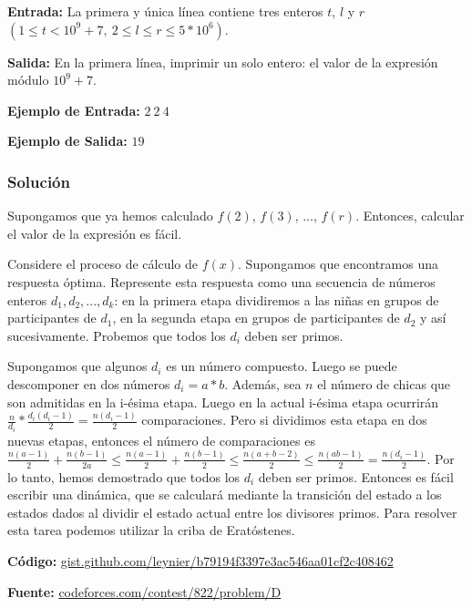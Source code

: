 \documentclass[12pt]{article}
\newcommand{\nl}{\vspace{0.3cm}}
\begin{document}
\textbf{Entrada:} La primera y única línea contiene tres enteros $t$, $l$ y $r$ $(1 \leqslant t < 10^9 + 7,\ 2 \leqslant l \leqslant r \leqslant 5 * 10^6)$.

\nl

\textbf{Salida:} En la primera línea, imprimir un solo entero: el valor de la expresión módulo $10^9 + 7$.

\nl

\textbf{Ejemplo de Entrada:} $2\ 2\ 4$

\nl

\textbf{Ejemplo de Salida:} $19$

\subsubsection{Solución}

Supongamos que ya hemos calculado $f(2)$, $f(3)$, $...$, $f(r)$. Entonces, calcular el valor de la expresión es fácil.

\nl

Considere el proceso de cálculo de $f(x)$. Supongamos que encontramos una respuesta óptima. Represente esta respuesta como una secuencia de números enteros $d_1, d_2, ..., d_k$: en la primera etapa dividiremos a las niñas en grupos de participantes de $d_1$, en la segunda etapa en grupos de participantes de $d_2$ y así sucesivamente. Probemos que todos los $d_i$ deben ser primos.

\nl

Supongamos que algunos $d_i$ es un número compuesto. Luego se puede descomponer en dos números $d_i = a * b$. Además, sea $n$ el número de chicas que son admitidas en la i-ésima etapa. Luego en la actual i-ésima etapa ocurrirán $ \frac{n}{d_i} * \frac{d_i(d_i - 1)}{2} =  \frac{n(d_i - 1)}{2}$ comparaciones. Pero si dividimos esta etapa en dos nuevas etapas, entonces el número de comparaciones es $ \frac{n(a-1)}{2} + \frac{n(b - 1)}{2a} \leqslant \frac{n(a-1)}{2} + \frac{n(b-1)}{2} \leqslant \frac{n(a+b-2)}{2} \leqslant \frac{n(ab - 1)}{2} = \frac{n(d_i - 1)}{2}$. Por lo tanto, hemos demostrado que todos los $d_i$ deben ser primos. Entonces es fácil escribir una dinámica, que se calculará mediante la transición del estado a los estados dados al dividir el estado actual entre los divisores primos. Para resolver esta tarea podemos utilizar la criba de Eratóstenes.

\nl

\textbf{Código:} \href{https://gist.github.com/leynier/b79194f3397e3ac546aa01cf2c408462}{gist.github.com/leynier/b79194f3397e3ac546aa01cf2c408462}

\nl

\textbf{Fuente:} \href{https://codeforces.com/contest/822/problem/D}{codeforces.com/contest/822/problem/D}

\newpage

\nocite{*}


	
\end{document}
